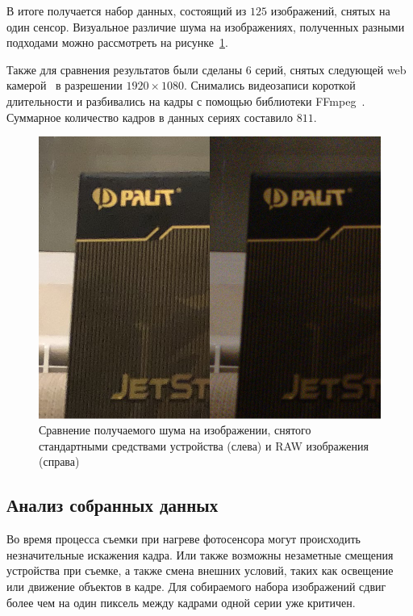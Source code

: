 \documentclass[14pt]{mmcs_article}
\begin{document}
В итоге получается набор данных, состоящий из $125$ изображений, снятых на один сенсор. Визуальное различие шума на изображениях, полученных разными подходами можно рассмотреть на рисунке~\ref{fig:noise_comprasion}.

Также для сравнения результатов были сделаны 6 серий, снятых следующей web камерой~\autocite{WebCam} в разрешении $1920\times1080$. Снимались видеозаписи короткой длительности и разбивались на кадры с помощью библиотеки FFmpeg~\autocite{FFMPEG}. Суммарное количество кадров в данных сериях составило $811$.

\begin{figure}[h]
	\centering
	\includegraphics[width=\textwidth]{img/noise_comprasion}
	\caption{Сравнение получаемого шума на изображении, снятого стандартными средствами устройства (слева) и RAW изображения (справа)}
	\label{fig:noise_comprasion}
\end{figure}


\subsection{Анализ собранных данных}

Во время процесса съемки при нагреве фотосенсора могут происходить незначительные искажения кадра. Или также возможны незаметные смещения устройства при съемке, а также смена внешних условий, таких как освещение или движение объектов в кадре. Для собираемого набора изображений сдвиг более чем на один пиксель между кадрами одной серии уже критичен.
\end{document}
